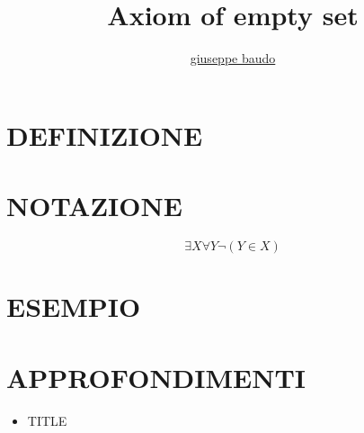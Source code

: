 \documentclass[a4paper,10pt]{article}
\title{Axiom of empty set}
\author{\href{http://www.baudo.hol.es}{giuseppe baudo}}
\begin{document}
\maketitle

\section{DEFINIZIONE}

\section{NOTAZIONE}
\[
  \exists X \forall Y \neg (Y \in X)
\]
\section{ESEMPIO}

\section{APPROFONDIMENTI}
\begin{itemize}
 \item TITLE
\end{itemize}
\end{document}
